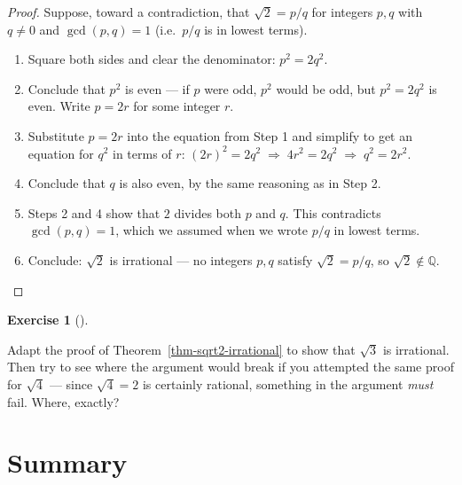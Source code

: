 \documentclass[
  letterpaper,
  DIV=11,
  numbers=noendperiod]{scrreprt}
\providecommand{\tightlist}{%
  \setlength{\itemsep}{0pt}\setlength{\parskip}{0pt}}
\theoremstyle{plain}
\theoremstyle{plain}
\theoremstyle{definition}
\theoremstyle{definition}
\newtheorem{exercise}{Exercise}[chapter]
\theoremstyle{definition}
\theoremstyle{plain}
\theoremstyle{plain}
\theoremstyle{remark}
\begin{document}
\begin{proof}
Suppose, toward a contradiction, that \(\sqrt2 = p/q\) for integers
\(p,q\) with \(q\neq 0\) and \(\gcd(p,q)=1\) (i.e.~\(p/q\) is in lowest
terms).

\begin{enumerate}
\def\labelenumi{\arabic{enumi}.}
\tightlist
\item
  Square both sides and clear the denominator: \(p^2 = 2q^2\).
\item
  Conclude that \(p^2\) is even --- if \(p\) were odd, \(p^2\) would be
  odd, but \(p^2=2q^2\) is even. Write \(p=2r\) for some integer \(r\).
\item
  Substitute \(p=2r\) into the equation from Step 1 and simplify to get
  an equation for \(q^2\) in terms of \(r\):
  \((2r)^2 = 2q^2 \;\Rightarrow\; 4r^2 = 2q^2 \;\Rightarrow\; q^2 = 2r^2\).
\item
  Conclude that \(q\) is also even, by the same reasoning as in Step 2.
\item
  Steps 2 and 4 show that \(2\) divides both \(p\) and \(q\). This
  contradicts \(\gcd(p,q)=1\), which we assumed when we wrote \(p/q\) in
  lowest terms.
\item
  Conclude: \(\sqrt2\) is irrational --- no integers \(p,q\) satisfy
  \(\sqrt2=p/q\), so \(\sqrt2 \notin \mathbb{Q}\).
\end{enumerate}

\end{proof}

\begin{exercise}[]\protect\hypertarget{exr-}{}\label{exr-}

Adapt the proof of Theorem~\ref{thm-sqrt2-irrational} to show that
\(\sqrt3\) is irrational. Then try to see where the argument would break
if you attempted the same proof for \(\sqrt4\) --- since \(\sqrt4=2\) is
certainly rational, something in the argument \emph{must} fail. Where,
exactly?

\end{exercise}

\section{Summary}\label{summary}
\end{document}
